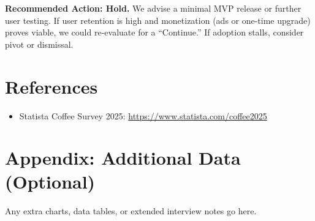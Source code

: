 \documentclass[12pt]{article}
\begin{document}
\textbf{Recommended Action: Hold.}  
We advise a minimal MVP release or further user testing. If user retention 
is high and monetization (ads or one-time upgrade) proves viable, we could 
re-evaluate for a “Continue.” If adoption stalls, consider pivot or dismissal.

\section*{References}
\begin{itemize}[leftmargin=2em]
    \item Statista Coffee Survey 2025: 
    \url{https://www.statista.com/coffee2025}
\end{itemize}

% 
% 

\appendix
\section{Appendix: Additional Data (Optional)}
Any extra charts, data tables, or extended interview notes go here.
\end{document}
